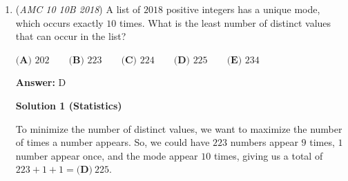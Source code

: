 \begin{enumerate}
 



\textbf{Solution 5}

Note that $101=x^2+1$ and $100...0001=x^n+1$, where $x=10$. We have that $\frac{x^n+1}{x^2+1}$ must have a remainder of $0$. By the remainder theorem, the roots of $x^2+1$ must also be roots of $x^n+1$. Plugging in $i,-i$ to $x^n+1$ yields that $n\equiv2\mod{4}$. Because the sequence starts with $10^2+1$, the answer is $\lceil 2018/4 \rceil=\boxed{\textbf{(C) } 505}$




\textbf{Solution 6 (Complex Numbers)}

The $n$th term of the sequence is $10^n+1$ for $n\ge 2$ (since $10^2+1=101$, $10^3+1=1001$, etc.). We seek those $n$ for which 
 \[101 \mid (10^n+1).\]Let $x = 10$. Note that $101=10^2+1$, so this is equivalent to the polynomial divisibility

 
 \[x^2+1 \mid x^n+1\]

 Over $\mathbb{C}$, $x^2+1$ has roots $i,-i$. Thus $x^2+1 \mid x^n+1$ if both $i,-i$ are roots of $x^n+1$, since,$i^n=-1 \quad \text{and} \quad (-i)^n=-1.$Because $i^4=1$, we have $i^n=-1$ exactly when $n\equiv 2 \pmod{4}$. For such $n$, $(-i)^n=(-1)^n i^n=i^n=-1$ as well, so the condition holds precisely when$n \equiv 2 \pmod{4}.$

 Among the first $2018$ terms of the sequence (which correspond to $n=2,3,\dots,2019$), the values of $n$ congruent to $2 \pmod{4}$ are$2,6,10,\dots,2018$.This is an arithmetic progression with common difference $4$; the count is

 $\frac{2018-2}{4}+1=\frac{2016}{4}+1=504+1=505$.Therefore, exactly $\boxed{505}$ of the first $2018$ numbers are divisible by $101$, which corresponds to choice $\boxed{\textbf{(C)}}$.

 


	\item (\textit{AMC 10 10B 2018}) A list of $2018$ positive integers has a unique mode, which occurs exactly $10$ times. What is the least number of distinct values that can occur in the list?


 $\textbf{(A) }202 \qquad \textbf{(B) }223 \qquad \textbf{(C) }224 \qquad \textbf{(D) }225 \qquad \textbf{(E) }234 \qquad$

 \textbf{Answer: }D



\textbf{Solution 1 (Statistics)}

To minimize the number of distinct values, we want to maximize the number of times a number appears. So, we could have $223$ numbers appear $9$ times, $1$ number appear once, and the mode appear $10$ times, giving us a total of $223 + 1 + 1 = \boxed{\textbf{(D)}\ 225}.$





\end{enumerate}
